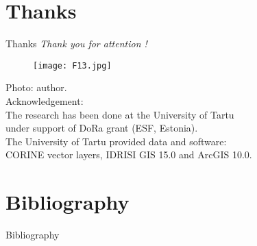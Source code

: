 \documentclass[pdflatex,compress,9pt,
	xcolor={dvipsnames,dvipsnames,svgnames,x11names,table},
	hyperref={colorlinks = true,breaklinks = true, urlcolor = NavyBlue, breaklinks = true}]{beamer}
\begin{document}
\section{Thanks}
\begin{frame}{Thanks}
\emph{Thank you for attention !}\\
\begin{figure}[H]
	\centering
		\texttt{[image: F13.jpg]}
\end{figure}
\small{Photo: author.}\\
\normalsize
Acknowledgement: \\
The research has been done at the University of Tartu \\
under support of DoRa grant (ESF, Estonia).\\
The University of Tartu provided \alert{data} and \alert{software}:\\
 \alert{CORINE} vector layers, \alert{IDRISI GIS} 15.0 and \alert{ArcGIS} 10.0.
\end{frame}

\section{Bibliography}
\Large{Bibliography}
\nocite{*}
\printbibliography[heading=none]
	
\end{document}
